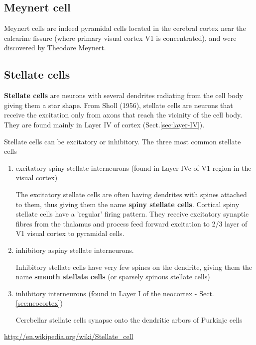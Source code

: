 \subsection{Meynert cell}
\label{sec:Meynert-cell}

Meynert cells are indeed pyramidal cells located in the cerebral cortex near the
calcarine fissure (where primary visual cortex V1 is concentrated), and were
discovered by Theodore Meynert.

\subsection{Stellate cells}
\label{sec:stellate_cells}


{\bf Stellate cells} are neurons with several dendrites radiating from the cell
body giving them a star shape. From Sholl (1956), stellate cells are neurons
that receive the excitation only from axons that reach the vicinity of the cell
body. They are found mainly in Layer IV of cortex (Sect.\ref{sec:layer-IV}).

Stellate cells can be excitatory or inhibitory. The three most common stellate
cells
\begin{enumerate}

  \item excitatory spiny stellate interneurons (found in Layer IVc of V1 region
  in the visual cortex)

The excitatory stellate cells are often having dendrites with spines attached to
them, thus giving them the name {\bf spiny stellate cells}.
Cortical spiny stellate cells have a 'regular' firing pattern.
They receive excitatory synaptic fibres from the thalamus and process feed
forward excitation to 2/3 layer of V1 visual cortex to pyramidal cells.

  \item inhibitory aspiny stellate  interneurons.

Inhibitory stellate cells have very few spines on the dendrite, giving them the
name {\bf smooth stellate cells} (or sparsely spinous stellate cells)

  \item inhibitory interneurons (found in Layer I of the neocortex - Sect.\ref{sec:neocortex})

Cerebellar stellate cells synapse onto the dendritic arbors of Purkinje
cells
  


\end{enumerate}
\url{http://en.wikipedia.org/wiki/Stellate_cell}


